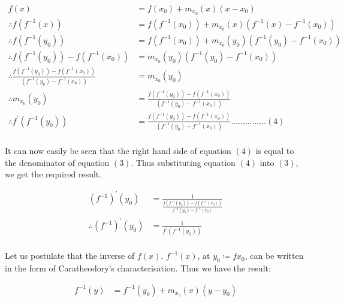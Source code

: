 		\begin{align*}
		f(x) & = f(x_0) + m_{x_0}(x)(x-x_0)\\
		\therefore f(f^{-1}(x)) & = f(f^{-1}(x_0)) + m_{x_0}(x)(f^{-1}(x)-f^{-1}(x_0))\\
		\therefore f(f^{-1}(y_0)) & = f(f^{-1}(x_0)) + m_{x_0}(y_0)(f^{-1}(y_0)-f^{-1}(x_0))\\
		\therefore f(f^{-1}(y_0)) - f(f^{-1}(x_0)) & = m_{x_0}(y_0)(f^{-1}(y_0)-f^{-1}(x_0))\\
		\therefore \frac{f(f^{-1}(y_0)) - f(f^{-1}(x_0))}{(f^{-1}(y_0)-f^{-1}(x_0))} & = m_{x_0}(y_0)\\
		\therefore m_{x_0}(y_0) & = \frac{f(f^{-1}(y_0)) - f(f^{-1}(x_0))}{(f^{-1}(y_0)-f^{-1}(x_0))}\\
		\therefore f^\prime (f^{-1}(y_0)) & = \frac{f(f^{-1}(y_0)) - f(f^{-1}(x_0))}{(f^{-1}(y_0)-f^{-1}(x_0))} \dots\dots\dots\dots\dots(4)\\
		\end{align*}

		It can now easily be seen that the right hand side of equation $(4)$ is equal to the denominator of equation $(3)$. Thus substituting equation $(4)$ into $(3)$, we get the required result.

		\begin{align*}
		(f^{-1})^\prime(y_0) & = \frac{1}{\frac{f(f^{-1}(y_0))-f(f^{-1}(x_0))}{f^{-1} (y_0) - f^{-1} (x_0)}}\\
		\therefore (f^{-1})^\prime(y_0) & = \frac{1}{f^\prime (f^{-1}(y_0))}\\
		\end{align*}






		
		Let us postulate that the inverse of $f(x)$, $f^{-1}(x)$, at $\displaystyle{y_0 \coloneqq f{x_0}}$, can be written in the form of Caratheodory's characterisation. Thus we have the result:

		\begin{align*}
		f^{-1}(y) & = f^{-1}(y_0) + m_{x_0}(x)(y-y_0)\\
		\end{align*}